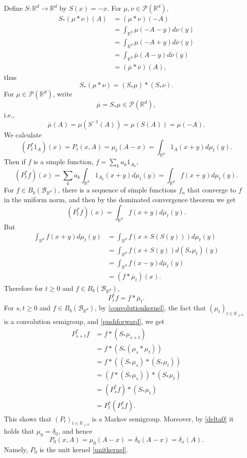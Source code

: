 \documentclass{article}
\theoremstyle{definition}
\begin{document}
Define $S:\mathbb{R}^d \to \mathbb{R}^d$ by $S(x)=-x$.
For $\mu,\nu \in \mathscr{P}(\mathbb{R}^d)$,
\begin{align*}
S_*(\mu*\nu)(A)&=(\mu*\nu)(-A)\\
&=\int_{\mathbb{R}^d} \mu(-A-y) d\nu(y)\\
&= \int_{\mathbb{R}^d} \mu(-A+y) d\overline{\nu}(y)\\
&=\int_{\mathbb{R}^d} \overline{\mu}(A-y) d\overline{\nu}(y)\\
&=(\overline{\mu}*\overline{\nu})(A),
\end{align*}
thus
\begin{equation}
S_*(\mu*\nu)=(S_*\mu)*(S_*\nu).
\label{pushforward}
\end{equation}
For $\mu \in \mathscr{P}(\mathbb{R}^d)$, write
\[
\overline{\mu} = S_*\mu \in \mathscr{P}(\mathbb{R}^d),
\]
i.e.,
\[
\overline{\mu}(A) = \mu(S^{-1}(A)) = \mu(S(A)) = \mu(-A).
\]
We calculate
\[
(P_t^* 1_A)(x) = P_t(x,A)= \mu_t(A-x) = \int_{\mathbb{R}^d} 1_A(x+y)d\mu_t(y).
\]
Then if $f$ is a simple function, $f=\sum_k a_k 1_{A_k}$,
\[
(P_t^* f)(x) = \sum_k a_k \int_{\mathbb{R}^d} 1_{A_k}(x+y) d\mu_t(y)
=\int_{\mathbb{R}^d} f(x+y) d\mu_t(y).
\]
For $f \in B_b(\mathscr{B}_{\mathbb{R}^d})$, there is a sequence of simple functions
$f_n$ that converge to $f$ in the uniform norm, and then by the dominated convergence theorem we get
\[
(P_t^*f)(x) = \int_{\mathbb{R}^d} f(x+y) d\mu_t(y).
\]
But
\begin{align*}
 \int_{\mathbb{R}^d} f(x+y) d\mu_t(y) &= \int_{\mathbb{R}^d} f(x+S(S(y))) d\mu_t(y)\\
& = \int_{\mathbb{R}^d} f(x+S(y)) d(S_*\mu_t)(y)\\
& = \int_{\mathbb{R}^d} f(x-y) d\overline{\mu}_t(y)\\
&= (f*\overline{\mu}_t)(x).
\end{align*}
Therefore for $t \geq 0$ and $f \in B_b(\mathscr{B}_{\mathbb{R}^d})$,
\begin{equation}
P_t^* f=  f*\overline{\mu}_t.
\label{convolutionkernel}
\end{equation}
For $s,t \geq 0$ and $f \in B_b(\mathscr{B}_{\mathbb{R}^d})$, by \eqref{convolutionkernel}, the fact that $(\mu_t)_{t \in \mathbb{R}_{\geq 0}}$ is a convolution
semigroup, and \eqref{pushforward}, we get
\begin{align*}
P_{s+t}^*f&=f*(S_*\mu_{s+t})\\
&=f*(S_*(\mu_s*\mu_t))\\
&=f*((S_*\mu_s)*(S_*\mu_t))\\
&=(f*(S_*\mu_s))*(S_*\mu_t)\\
&=(P_s^* f)*(S_*\mu_t)\\
&=P_t^* (P_s^*f).
\end{align*}
This shows that $(P_t)_{t \in \mathbb{R}_{\geq 0}}$ is a Markov semigroup. 
Moreover, by \eqref{delta0} it holds that $\mu_0=\delta_0$, and hence
\[
P_0(x,A) = \mu_0(A-x) = \delta_0(A-x) = \delta_x(A).
\]
Namely, $P_0$ is the unit kernel \eqref{unitkernel}. 
\end{document}

